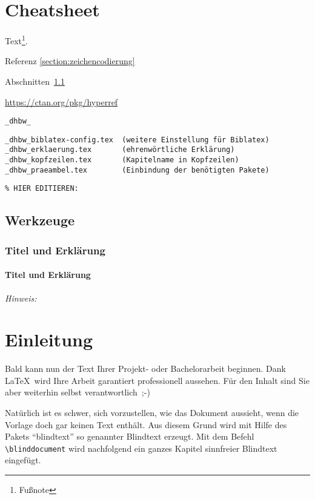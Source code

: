 \chapter{Cheatsheet}

Text\footnote{Fußnote}.

Referenz \ref{section:zeichencodierung}

Abschnitten~\ref{section:werkzeuge}

\url{https://ctan.org/pkg/hyperref}

\verb|_dhbw_|

\begin{verbatim}
_dhbw_biblatex-config.tex  (weitere Einstellung für Biblatex)
_dhbw_erklaerung.tex       (ehrenwörtliche Erklärung)
_dhbw_kopfzeilen.tex       (Kapitelname in Kopfzeilen) 
_dhbw_praeambel.tex        (Einbindung der benötigten Pakete)
\end{verbatim}

\lstset{language=TeX} 
\begin{lstlisting}
% HIER EDITIEREN: 
\end{lstlisting}

\section{Werkzeuge}\label{section:werkzeuge}

\subsection{Titel und Erklärung}

\subsubsection{Titel und Erklärung}

\emph{Hinweis:}


\chapter{Einleitung}

Bald kann nun der Text Ihrer Projekt- oder Bachelorarbeit beginnen. Dank \LaTeX\ wird Ihre Arbeit garantiert professionell aussehen. Für den Inhalt sind Sie aber weiterhin selbst verantwortlich~\mbox{;-)}

Natürlich ist es schwer, sich vorzustellen, wie das Dokument aussieht, wenn die Vorlage doch gar keinen Text enthält. Aus diesem Grund wird mit Hilfe des Pakets \enquote{blindtext} so genannter Blindtext erzeugt. Mit dem Befehl \verb|\blinddocument| wird nachfolgend ein ganzes Kapitel sinnfreier Blindtext eingefügt.

